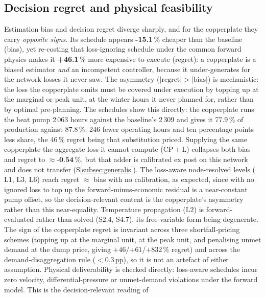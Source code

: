 \documentclass[a4paper,fleqn]{cas-sc}
\newcommand{\CPL}{\ensuremath{\mathrm{CP{+}L}}} %
\newcommand{\Lone}{\ensuremath{\mathrm{L1}}}    %
\newcommand{\Ltwo}{\ensuremath{\mathrm{L2}}}    %
\newcommand{\Lthree}{\ensuremath{\mathrm{L3}}}  %
\newcommand{\Lsix}{\ensuremath{\mathrm{L6}}}    %
\begin{document}
\subsection{Decision regret and physical feasibility}
Estimation bias and decision regret diverge sharply, and for the copperplate they
carry \emph{opposite signs}. Its schedule appears \textbf{-15.1}\,\% cheaper
than the baseline (bias), yet re-costing that loss-ignoring schedule under the common
forward physics makes it \textbf{+46.1}\,\% more expensive to execute
(regret): a copperplate is a biased estimator \emph{and} an incompetent controller,
because it under-generates for the network losses it never saw. The asymmetry
($|\text{regret}|>|\text{bias}|$) is mechanistic: the loss the copperplate omits must
be covered under execution by topping up at the marginal or peak unit, at the winter
hours it never planned for, rather than by optimal pre-planning. The schedules show this directly: the copperplate runs the heat pump 2\,063 hours against the baseline's 2\,309 and gives it 77.9\,\% of production against 87.8\,\%: 246 fewer operating hours and ten percentage points less share, the 46\,\% regret being that substitution priced. Supplying the same
copperplate the aggregate loss it cannot compute (\CPL) collapses both bias and regret
to $\approx\textbf{-0.54}\,\%$, but that adder is calibrated ex post on this
network and does not transfer (S\ref{subsec:generalis}). The loss-aware node-resolved levels
(\Lone, \Lthree, \Lsix) reach regret $\approx$ bias with no calibration, as expected, since with
no ignored loss to top up the forward-minus-economic residual is a near-constant pump offset, so
the decision-relevant content is the copperplate's asymmetry rather than this near-equality.
Temperature propagation (\Ltwo) is forward-evaluated rather than solved (S2.4, S4.7), its
free-variable form being degenerate. The sign of the
copperplate regret is invariant across three shortfall-pricing schemes (topping up at
the marginal unit, at the peak unit, and penalising unmet demand at the dump price, giving
$+46$/$+61$/$+832$\,\% regret) and across the demand-disaggregation rule
($<0.3$\,pp), so it is not an artefact of either assumption. Physical deliverability is
checked directly: loss-aware schedules incur zero velocity, differential-pressure or
unmet-demand violations under the forward model. This is the decision-relevant reading of
\end{document}
